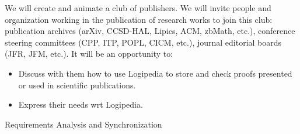 \begin{workpackage}[id=dissemination,wphases=0-48,type=MGT,
  short=Dissemination,%
  title={Dissemination, communication, and exploitation},
  lead=Inr,
  BolRM=3,
  InrRM=10]
\begin{tasklist}
\begin{task}[id=education,title=Expanding the use of Logipedia in education]
  \end{task}

  \begin{task}[id=publishers,title=Expanding the use of Logipedia in publishing]
    We will create and animate a club of publishers. We will invite
    people and organization working in the publication of research
    works to join this club: publication archives (arXiv, CCSD-HAL,
    Lipics, ACM, zbMath, etc.), conference steering committees (CPP,
    ITP, POPL, CICM, etc.), journal editorial boards (JFR, JFM,
    etc.). It will be an opportunity to:
    \begin{itemize}
    \item Discuss with them how to use Logipedia to store and check
      proofs presented or used in scientific publications.
    \item Express their needs wrt Logipedia.
    \end{itemize}
  \end{task}
\end{tasklist}

\begin{wpdelivs}
  \begin{wpdeliv}[due=3,miles=startup,id=requirements,dissem=PU,nature=DEM,lead=Inr]
      {Requirements Analysis and Synchronization}
\end{wpdeliv}
\end{wpdelivs}
\end{workpackage}



